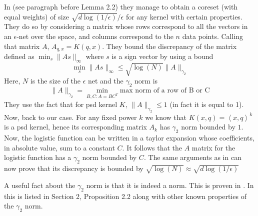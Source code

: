 \documentclass[anon,12pt]{colt2019} %
\newcommand{\ip}[1]{\left \langle #1 \right \rangle}
\newcommand{\eps}{\epsilon}
\begin{document}
In \cite{DBLP:journals/corr/abs-1802-01751} (see paragraph before Lemma 2.2) they manage to obtain a coreset (with equal weights) of size $\sqrt{d \log(1/\eps)}/\eps$ for any kernel with certain properties. They do so by considering a matrix whose rows correspond to all the vectors in an $\eps$-net over the space, and columns correspond to the $n$ data points. Calling that matrix $A$, $A_{q,x} = K(q,x)$. They bound the discrepancy of the matrix defined as $\min_s \|As\|_\infty$ where $s$ is a sign vector by using a bound 
$$ \min_s \|As\|_\infty \leq \sqrt{\log(N)} \|A\|_{\gamma_2} $$
Here, $N$ is the size of the $\eps$ net and the $\gamma_2$ norm is 
$$ \|A\|_{\gamma_2} = \min_{B,C: A=BC^T} \text{max norm of a row of B or C}$$
They use the fact that for psd kernel $K$, $\|A\|_{\gamma_2} \leq 1$ (in fact it is equal to 1). Now, back to our case. For any fixed power $k$ we know that $K(x,q)=\ip{x,q}^k$ is a psd kernel, hence its corresponding matrix $A_k$ has $\gamma_2$ norm bounded by $1$. Now, the logistic function can be written in a taylor expansion whose coefficients, in absolute value, sum to a constant $C$. It follows that the $A$ matrix for the logistic function has a $\gamma_2$ norm bounded by $C$. The same arguments as in  \cite{DBLP:journals/corr/abs-1802-01751} can now prove that its discrepancy is bounded by $\sqrt{\log(N)} \approx \sqrt{d\log(1/\eps)}$

A useful fact about the $\gamma_2$ norm is that it is indeed a norm. This is proven in \cite{tomczak1989banach}. In \cite{matouvsek2014factorization} this is listed in Section 2, Proposition 2.2 along with other known properties of the $\gamma_2$ norm. 

\end{document}
